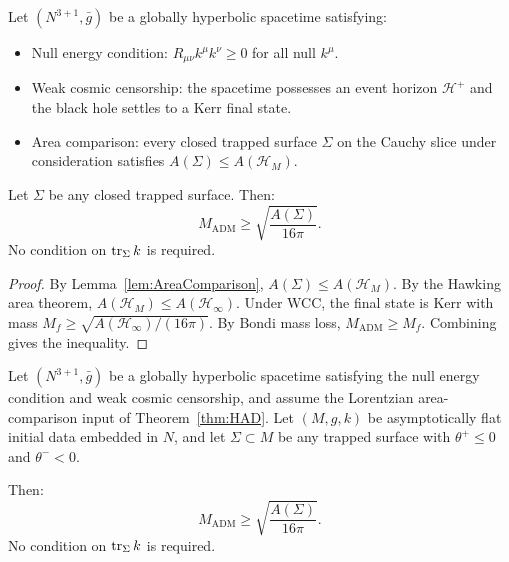 \begin{theorem}\label{thm:Penrose1973Complete}
Let $(N^{3+1}, \bar{g})$ be a globally hyperbolic spacetime satisfying:
\begin{itemize}
    \item[\textup{(NEC)}] Null energy condition: $R_{\mu\nu} k^\mu k^\nu \ge 0$ for all null $k^\mu$.
    \item[\textup{(WCC)}] Weak cosmic censorship: the spacetime possesses an event horizon $\mathcal{H}^+$ and the black hole settles to a Kerr final state.
    \item[\textup{(AC)}] Area comparison: every closed trapped surface $\Sigma$ on the Cauchy slice under consideration satisfies $A(\Sigma) \le A(\mathcal{H}_M)$.
\end{itemize}
Let $\Sigma$ be any closed trapped surface. Then:
\begin{equation}
    M_{\mathrm{ADM}} \ge \sqrt{\frac{A(\Sigma)}{16\pi}}.
\end{equation}
No condition on $\operatorname{tr}_\Sigma k$ is required.
\end{theorem}
\begin{proof}
By Lemma~\ref{lem:AreaComparison}, $A(\Sigma) \le A(\mathcal{H}_M)$. By the Hawking area theorem, $A(\mathcal{H}_M) \le A(\mathcal{H}_\infty)$. Under WCC, the final state is Kerr with mass $M_f \ge \sqrt{A(\mathcal{H}_\infty)/(16\pi)}$. By Bondi mass loss, $M_{\mathrm{ADM}} \ge M_f$. Combining gives the inequality.
\end{proof}

\begin{theorem}\label{thm:DirectSpacetime}
Let $(N^{3+1}, \bar{g})$ be a globally hyperbolic spacetime satisfying the null energy condition and weak cosmic censorship, and assume the Lorentzian area-comparison input of Theorem~\ref{thm:HAD}. Let $(M, g, k)$ be asymptotically flat initial data embedded in $N$, and let $\Sigma \subset M$ be any trapped surface with $\theta^+ \le 0$ and $\theta^- < 0$.

Then:
\begin{equation}
    M_{\mathrm{ADM}} \ge \sqrt{\frac{A(\Sigma)}{16\pi}}.
\end{equation}
No condition on $\operatorname{tr}_\Sigma k$ is required.
\end{theorem}

